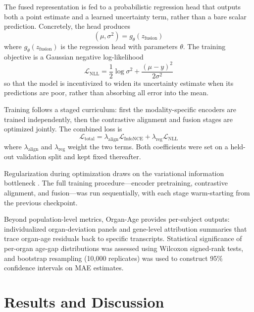 \documentclass[10pt,twocolumn]{article}
\begin{document}
The fused representation is fed to a probabilistic regression head that outputs both a point
estimate and a learned uncertainty term, rather than a bare scalar prediction. Concretely, the
head produces
\begin{equation}
(\mu, \sigma^2) = g_{\theta}(z_{\text{fusion}})
\label{eq:age_prediction}
\end{equation}
where $g_{\theta}(z_{\text{fusion}})$ is the regression head with parameters $\theta$. The
training objective is a Gaussian negative log-likelihood \cite{kendall2017}
\begin{equation}
\mathcal{L}_{\text{NLL}}
=
\frac{1}{2}\log\sigma^2
+
\frac{(\mu-y)^2}{2\sigma^2}
\label{eq:gnll}
\end{equation}
so that the model is incentivized to widen its uncertainty estimate when its predictions are
poor, rather than absorbing all error into the mean.

Training follows a staged curriculum: first the modality-specific encoders are trained
independently, then the contrastive alignment and fusion stages are optimized jointly. The
combined loss is
\begin{equation}
\mathcal{L}_{\text{total}}
=
\lambda_{\text{align}} \mathcal{L}_{\text{InfoNCE}}
+
\lambda_{\text{reg}} \mathcal{L}_{\text{NLL}}
\label{eq:total_loss}
\end{equation}
where $\lambda_{\text{align}}$ and $\lambda_{\text{reg}}$ weight the two terms. Both
coefficients were set on a held-out validation split and kept fixed thereafter.

Regularization during optimization draws on the variational information bottleneck
\cite{alemi2016vib}. The full training procedure---encoder pretraining, contrastive alignment,
and fusion---was run sequentially, with each stage warm-starting from the previous checkpoint.

Beyond population-level metrics, Organ-Age provides per-subject outputs: individualized
organ-deviation panels and gene-level attribution summaries that trace organ-age residuals
back to specific transcripts. Statistical significance of per-organ age-gap distributions was
assessed using Wilcoxon signed-rank tests, and bootstrap resampling (10{,}000 replicates) was
used to construct 95\% confidence intervals on MAE estimates.

\section{Results and Discussion}
\end{document}
